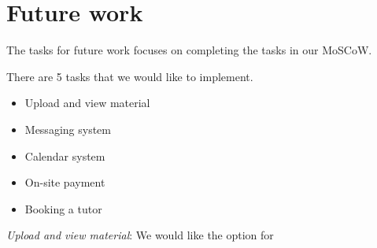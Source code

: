 \section{Future work}
The tasks for future work focuses on completing the tasks in our MoSCoW.

There are 5 tasks that we would like to implement.

\begin{itemize}
    \item Upload and view material
    \item Messaging system
    \item Calendar system
    \item On-site payment
    \item Booking a tutor
\end{itemize}

\textit{Upload and view material}:
We would like the option for 
